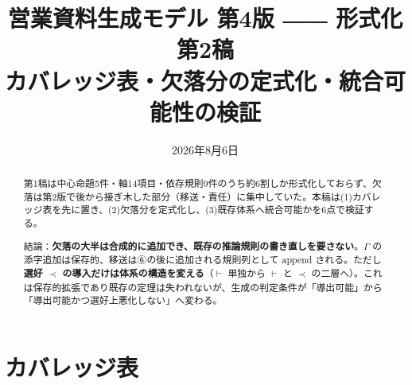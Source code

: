 \documentclass[11pt,a4paper]{article}
\title{\textbf{営業資料生成モデル 第4版 ―― 形式化 第2稿}\\[4pt]
\large カバレッジ表・欠落分の定式化・統合可能性の検証}
\author{}
\date{2026年8月6日}
\begin{document}
\maketitle

\begin{abstract}\noindent
第1稿は中心命題5件・軸14項目・依存規則9件のうち約6割しか形式化しておらず、欠落は第2版で後から接ぎ木した部分（移送・責任）に集中していた。本稿は(1)カバレッジ表を先に置き、(2)欠落分を定式化し、(3)既存体系へ統合可能かを6点で検証する。

結論：\textbf{欠落の大半は合成的に追加でき、既存の推論規則の書き直しを要さない}。$\Gamma$ の添字追加は保存的、移送は⑥の後に追加される規則列として append される。ただし\textbf{選好 $\prec$ の導入だけは体系の構造を変える}（$\vdash$ 単独から $\vdash$ と $\prec$ の二層へ）。これは保存的拡張であり既存の定理は失われないが、生成の判定条件が「導出可能」から「導出可能かつ選好上悪化しない」へ変わる。
\end{abstract}

\section{カバレッジ表}
\end{document}
